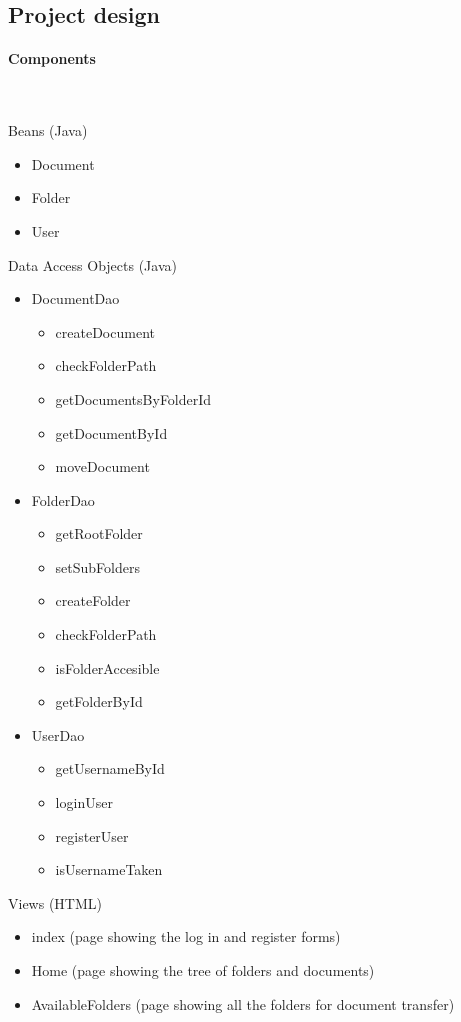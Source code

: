 \documentclass[a4paper,12pt]{article}
\newcommand{\myparagraph}[1]{\paragraph{#1}\mbox{}\\}
\begin{document}
\subsection{Project design}
\myparagraph{Components}

\begin{multicols}{2}
Beans (Java)
\begin{itemize}
	\item{Document}
	\item{Folder}
	\item{User}
\end{itemize}
Data Access Objects (Java)
\begin{itemize}
	\item{DocumentDao}
		\begin{itemize}
			\item{createDocument}
			\item{checkFolderPath}
			\item{getDocumentsByFolderId}
			\item{getDocumentById}
			\item{moveDocument}
		\end{itemize}
	\item{FolderDao}
		\begin{itemize}
			\item{getRootFolder}
			\item{setSubFolders}
			\item{createFolder}
			\item{checkFolderPath}
			\item{isFolderAccesible}
			\item{getFolderById}
		\end{itemize}
	\item{UserDao}
		\begin{itemize}
			\item{getUsernameById}
			\item{loginUser}
			\item{registerUser}
			\item{isUsernameTaken}
		\end{itemize}
\end{itemize}
Views (HTML)
\begin{itemize}
	\item{index} (page showing the log in and register forms)
	\item{Home} (page showing the tree of folders and documents)
	\item{AvailableFolders (page showing all the folders for document transfer)}

\end{itemize}
\end{multicols}
\end{document}
